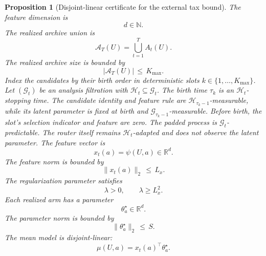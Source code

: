 \documentclass{article} %
\newtheorem{proposition}[theorem]{Proposition}
\begin{document}
\begin{proposition}[Disjoint-linear certificate for the external tax bound]
\label{prop:2}
The feature dimension is
\begin{equation}
\label{eq:app-lin-d}
d\in\mathbb{N}.
\end{equation}
The realized archive union is
\begin{equation}
\label{eq:app-realized-union}
\mathcal{A}_T(U)
=
\bigcup_{t=1}^{T}A_t(U).
\end{equation}
The realized archive size is bounded by
\begin{equation}
\label{eq:app-kmax}
|\mathcal{A}_T(U)|
\,\le\,
K_{\max}.
\end{equation}
Index the candidates by their birth order in deterministic slots
$k\in\{1,\ldots,K_{\max}\}$. Let \((\mathcal G_t)\) be an analysis filtration
with \(\mathcal H_t\subseteq\mathcal G_t\). The birth time \(\tau_k\) is an
\(\mathcal H_t\)-stopping time. The candidate identity and feature rule are
\(\mathcal H_{\tau_k-1}\)-measurable, while its latent parameter is fixed at
birth and \(\mathcal G_{\tau_k-1}\)-measurable. Before birth, the slot's
selection indicator and feature are zero. The padded process is
\(\mathcal G_t\)-predictable. The router itself remains
\(\mathcal H_t\)-adapted and does not observe the latent parameter.
The feature vector is
\begin{equation}
\label{eq:app-lin-feature}
x_t(a)
=
\psi(U,a)\in\mathbb{R}^{d}.
\end{equation}
The feature norm is bounded by
\begin{equation}
\label{eq:app-lin-feature-bound}
\|x_t(a)\|_2
\,\le\,
L_x.
\end{equation}
The regularization parameter satisfies
\begin{equation}
\label{eq:app-lin-lambda}
\lambda
>
0,
\qquad
\lambda
\ge
L_x^2.
\end{equation}
Each realized arm has a parameter
\begin{equation}
\label{eq:app-lin-theta}
\theta_a^\star\in\mathbb{R}^{d}.
\end{equation}
The parameter norm is bounded by
\begin{equation}
\label{eq:app-lin-theta-bound}
\|\theta_a^\star\|_2
\,\le\,
S.
\end{equation}
The mean model is disjoint-linear:
\begin{equation}
\label{eq:app-lin-model}
\mu(U,a)
=
x_t(a)^\top\theta_a^\star.
\end{equation}

\end{proposition}
\end{document}
